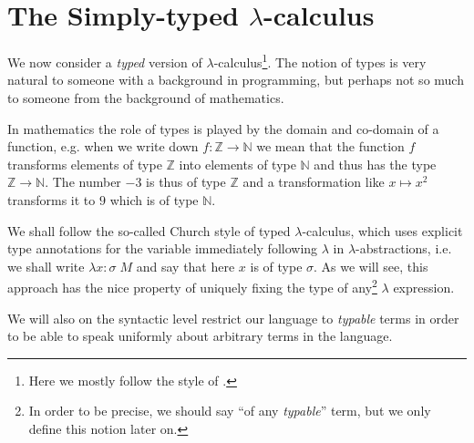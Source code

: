 \section{The Simply-typed $\lambda$-calculus}

We now consider a \emph{typed} version of $\lambda$-calculus\footnote{Here we
mostly follow the style of \smartcite{lectures}.}.  The notion of types is very
natural to someone with a background in programming, but perhaps not so much to
someone from the background of mathematics.

In mathematics the role of types is played by the domain and co-domain of a
function, e.g. when we write down $f: \mathbb{Z} \rightarrow \mathbb{N}$ we
mean that the function $f$ transforms elements of type $\mathbb{Z}$ into
elements of type $\mathbb{N}$ and thus has the type $\mathbb{Z} \rightarrow
\mathbb{N}$. The number $-3$ is thus of type $\mathbb{Z}$ and a transformation like
$x \mapsto x^2$ transforms it to $9$ which is of type $\mathbb{N}$.

We shall follow the so-called Church style of typed $\lambda$-calculus, which
uses explicit type annotations for the variable immediately following
$\lambda$ in $\lambda$-abstractions, i.e. we shall write $\lambda
x\!:\!\sigma\; M$ and say that here $x$ is of type $\sigma$. As we will see,
this approach has the nice property of uniquely fixing the type of
any\footnote{In order to be precise, we should say ``of any \emph{typable}''
term, but we only define this notion later on.} $\lambda$ expression.

We will also on the syntactic level restrict our language to \emph{typable}
terms in order to be able to speak uniformly about arbitrary terms in the
language.


